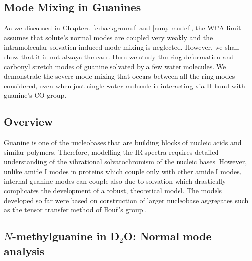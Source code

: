 \documentclass[a4paper,titlepage,twoside,fleqn,12pt]{book}
\begin{document}
\begin{refsection}
\chapter{Mode Mixing in Guanines\label{c:mode-mixing-guanines}}

As we discussed in Chapters~\ref{c:background} and \ref{c:my-model}, 
the WCA limit assumes
that solute's normal modes are coupled very weakly and the intramolecular
solvation\hyp{}induced mode mixing is neglected. However, we shall
show that it is not always the case. Here we study the ring deformation
and carbonyl stretch modes of guanine solvated by a few water
molecules. We demonstrate the severe mode mixing that occurs
between all the ring modes considered, even when just single water molecule
is interacting via H-bond with guanine's CO group. 

\section{Overview}

Guanine is one of the nucleobases that are building blocks of
nucleic acids and similar polymers. \citep{Limongelli.DeTito.Cerofolini.Fragai.Pagano.Trotta.Cosconati.Marinelli.Novellino.Bertini.Randazzo.Luchinat.Parrinello.Angew.2013,
Peng.Jones.Tokmakoff.JACS.2011} Therefore, modelling the
IR spectra requires detailed understanding of the vibrational
solvatochromism of the nucleic bases. However, unlike amide I modes
in proteins which couple only with other amide I modes, 
internal guanine modes can couple also due to solvation
which drastically complicates the development of a robust, 
theoretical model. The models developed so far were based
on construction of larger nucleobase aggregates such as
the tensor transfer method of Bou\v{r}'s group \citep{Bour.Sopkova.Bednarova.Malon.Keiderling.JCC.1997,
Andrushchenko.Tsankov.Krasteva.Wieser.Bour.JACS.2011}.

\section{$N$-methylguanine in D$_2$O: Normal mode analysis}


\end{refsection}
\end{document}
